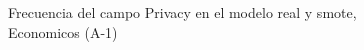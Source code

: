 \begin{figure}[H]
    \centering
    
    \caption{Frecuencia del campo Privacy en el modelo real y smote, Economicos (A-1)}
    \label{frecuency-Privacy-smote-enc}
\end{figure}